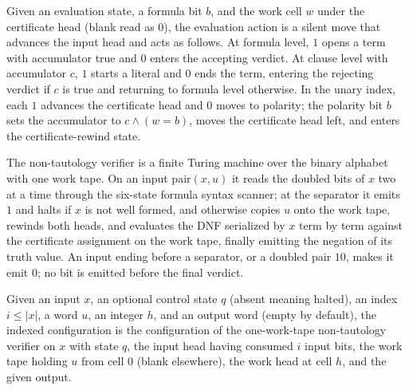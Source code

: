 \begin{definition}
\label{Complexity.tautEvalAction}
\leanok
{}
Given an evaluation state, a formula bit $b$, and the work cell $w$ under the
certificate head (blank read as $0$), the evaluation action is a silent move that
advances the input head and acts as follows. At formula level, $1$ opens a term with
accumulator true and $0$ enters the accepting verdict. At clause level with
accumulator $c$, $1$ starts a literal and $0$ ends the term, entering the rejecting
verdict if $c$ is true and returning to formula level otherwise. In the unary index,
each $1$ advances the certificate head and $0$ moves to polarity; the polarity bit
$b$ sets the accumulator to $c \wedge (w = b)$, moves the certificate head left, and
enters the certificate-rewind state.
\end{definition}

\begin{definition}
\label{Complexity.tautTM}
\leanok
{}
The non-tautology verifier is a finite Turing machine over the binary alphabet with
one work tape. On an input $\mathrm{pair}(x, u)$ it reads the doubled bits of $x$ two
at a time through the six-state formula syntax scanner; at the separator it emits $1$
and halts if $x$ is not well formed, and otherwise copies $u$ onto the work tape,
rewinds both heads, and evaluates the DNF serialized by $x$ term by term against the
certificate assignment on the work tape, finally emitting the negation of its truth
value. An input ending before a separator, or a doubled pair $10$, makes it emit $0$;
no bit is emitted before the final verdict.
\end{definition}

\begin{definition}
\label{Complexity.tautCfg}
\leanok
{}
Given an input $x$, an optional control state $q$ (absent meaning halted), an index
$i \le |x|$, a word $u$, an integer $h$, and an output word (empty by default), the
indexed configuration is the configuration of the one-work-tape non-tautology
verifier on $x$ with state $q$, the input head having consumed $i$ input bits, the
work tape holding $u$ from cell $0$ (blank elsewhere), the work head at cell $h$,
and the given output.
\end{definition}

